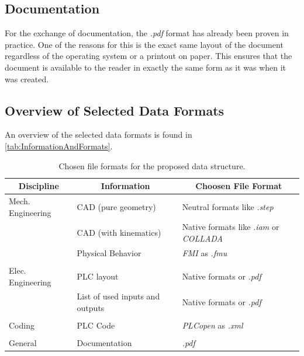     \subsection{Documentation}
    For the exchange of documentation, the \textit{.pdf} format has already been proven in practice. One of the reasons for this is the exact same layout of the document regardless of the operating system or a printout on paper. This ensures that the document is available to the reader in exactly the same form as it was when it was created. 
    
    \subsection{Overview of Selected Data Formats}
    An overview of the selected data formats is found in \autoref{tab:InformationAndFormats}.
    \begin{table}[htp]
        \footnotesize
        \centering
        \caption{Chosen file formats for the proposed data structure.}
        \begin{tabular}{lll}
        	\toprule
        	\multicolumn{1}{c}{Discipline} & \multicolumn{1}{c}{Information} & \multicolumn{1}{c}{Choosen File Format}\\
        	\midrule
        	
            Mech. Engineering & CAD (pure geometry) & Neutral formats like \textit{.step}\\
            & CAD (with kinematics) & Native formats like \textit{.iam} or \textit{COLLADA}  \\
            
            & Physical Behavior & \textit{FMI} as \textit{.fmu} \\
            & & \\
            Elec. Engineering & PLC layout  & Native formats or \textit{.pdf} \\
            & List of used inputs and outputs  & Native formats or \textit{.pdf} \\
            & & \\
            Coding & PLC Code & \textit{PLCopen} as \textit{.xml}\\
            & & \\
            General & Documentation & \textit{.pdf}\\
        	\bottomrule	
        \end{tabular}	
        \label{tab:InformationAndFormats}
    \end{table}


